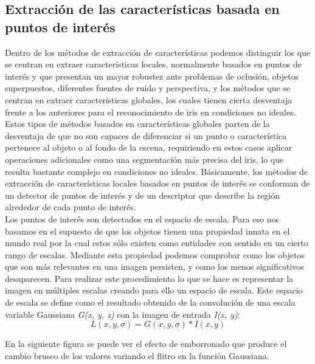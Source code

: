\subsection{Extracción de las características basada en puntos de interés}

Dentro de los métodos de extracción de características podemos distinguir los que se centran en extraer características locales, normalmente basados en puntos de interés y que presentan un mayor robustez ante problemas de oclusión, objetos superpuestos, diferentes fuentes de ruido y perspectiva, y los métodos que se centran en extraer características globales, los cuales tienen cierta desventaja frente a los anteriores para el reconocimiento de iris en condiciones no ideales. Estos tipos de métodos basados en características globales parten de la desventaja de que no son capaces de diferenciar si un punto o característica pertenece al objeto o al fondo de la escena, requiriendo en estos casos aplicar operaciones adicionales como una segmentación más precisa del iris, lo que resulta bastante complejo en condiciones no ideales. Básicamente, los métodos de extracción de características locales basados en puntos de interés se conforman de un detector de puntos de interés y de un descriptor que describe la región alrededor de cada punto de interés. \\

Los puntos de interés son detectados en el espacio de escala. Para eso nos basamos en el supuesto de que los objetos tienen una propiedad innata en el mundo real por la cual estos sólo existen como entidades con sentido en un cierto rango de escalas. Mediante esta propiedad podemos comprobar como los objetos que son más relevantes en una imagen persisten, y como los menos significativos desaparecen. Para realizar este procedimiento lo que se hace es representar la imagen en múltiples escalas creando para ello un espacio de escala. Este espacio de escala se define como el resultado obtenido de la convolución de una escala variable Gaussiana \textit{G(x, y, z)} con la imagen de entrada \textit{I(x, y)}:\\

\[
L(x,y,\sigma) = G(x,y,\sigma) * I(x,y)
\]

En la siguiente figura se puede ver el efecto de emborronado que produce el cambio brusco de los valores variando el flitro en la función Gaussiana. \\ \\ \\

